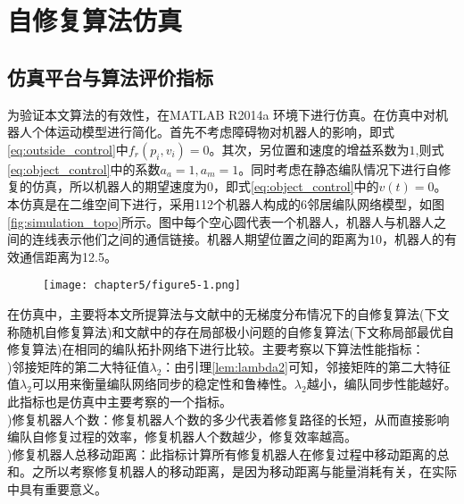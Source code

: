 \chapter{自修复算法仿真}

\section{仿真平台与算法评价指标}
为验证本文算法的有效性，在MATLAB R2014a 环境下进行仿真。在仿真中对机器人个体运动模型进行简化。首先不考虑障碍物对机器人的影响，即式\ref{eq:outside_control}中$f_r(p_i,v_i) = 0$。其次，另位置和速度的增益系数为$1$,则式\ref{eq:object_control}中的系数$a_a=1, a_m=1$。同时考虑在静态编队情况下进行自修复的仿真，所以机器人的期望速度为0，即式\ref{eq:object_control}中的$v(t) = 0$。本仿真是在二维空间下进行，采用112个机器人构成的6邻居编队网络模型，如图\ref{fig:simulation_topo}所示。图中每个空心圆代表一个机器人，机器人与机器人之间的连线表示他们之间的通信链接。机器人期望位置之间的距离为10，机器人的有效通信距离为12.5。
\begin{figure}[!htbp]
	\centering
	\texttt{[image: chapter5/figure5-1.png]}
\end{figure}

在仿真中，主要将本文所提算法与文献\parencite{张飞2008移动机器人覆盖问题的研究}中的无梯度分布情况下的自修复算法(下文称随机自修复算法)和文献\parencite{liu2015gradient}中的存在局部极小问题的自修复算法(下文称局部最优自修复算法)在相同的编队拓扑网络下进行比较。主要考察以下算法性能指标：\\
)邻接矩阵的第二大特征值$\lambda_2$：由引理\ref{lem:lambda2}可知，邻接矩阵的第二大特征值$\lambda_2$可以用来衡量编队网络同步的稳定性和鲁棒性。$\lambda_2$越小，编队同步性能越好。此指标也是仿真中主要考察的一个指标。\\
)修复机器人个数：修复机器人个数的多少代表着修复路径的长短，从而直接影响编队自修复过程的效率，修复机器人个数越少，修复效率越高。\\
)修复机器人总移动距离：此指标计算所有修复机器人在修复过程中移动距离的总和。之所以考察修复机器人的移动距离，是因为移动距离与能量消耗有关，在实际中具有重要意义。


